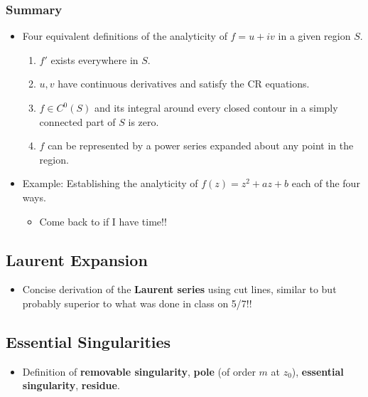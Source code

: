 \documentclass[../finalProject.tex]{subfiles}
\begin{document}
\subsubsection{Summary}
\begin{itemize}
    \item Four equivalent definitions of the analyticity of $f=u+iv$ in a given region $S$.
    \begin{enumerate}
        \item $f'$ exists everywhere in $S$.
        \item $u,v$ have continuous derivatives and satisfy the CR equations.
        \item $f\in C^0(S)$ and its integral around every closed contour in a simply connected part of $S$ is zero.
        \item $f$ can be represented by a power series expanded about any point in the region.
    \end{enumerate}
    \item Example: Establishing the analyticity of $f(z)=z^2+az+b$ each of the four ways.
    \begin{itemize}
        \item Come back to if I have time!!
    \end{itemize}
\end{itemize}


\subsection{Laurent Expansion}
\begin{itemize}
    \item Concise derivation of the \textbf{Laurent series} using cut lines, similar to but probably superior to what was done in class on 5/7!!
\end{itemize}


\subsection{Essential Singularities}
\begin{itemize}
    \item Definition of \textbf{removable singularity}, \textbf{pole} (of order $m$ at $z_0$), \textbf{essential singularity}, \textbf{residue}.
\end{itemize}
\end{document}
